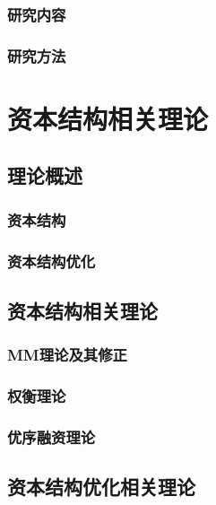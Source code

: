 \subsection{研究内容}
\subsection{研究方法}
\cite{Brusov2023}
\cite{Cao2018}
\cite{Chen2022}
\cite{Dai2022}
\cite{Dong2019}
\cite{Du2016}
\cite{Gu2022}
\cite{Hong2015}
\cite{Li2019}
\cite{Li2019a}
\cite{Li2021}
\cite{Li2023}
\cite{Liaqat2021}
\cite{Liu2017}
\cite{Liu2019}
\cite{Liu2022}
\cite{Liu2023}


\cite{Ma2022}
\cite{Mbulawa2020}
\cite{Meng2020}
\cite{Modigliani1958}
\cite{Shen2022}
\cite{Song2021}
\cite{Spitsin2020}
\cite{Su2022}
\cite{Sun2020}
\cite{Wan2022}
\cite{Wang2008}
\cite{Wang2021}
\cite{Wangchen2022}
\cite{Xiong2022}
\cite{Xu2022}
\cite{Xu2022a}
\cite{Yang2014}
\cite{Yang2020}
\cite{Yao2022}
\cite{Yu2017}
\cite{Zhang2014}
\cite{Zhang2022}
\cite{Zhang2022a}
\cite{Zhu2022}
\cite{Zhu2023}
\cite{Zuo2020}
\chapter{资本结构相关理论}
\section{理论概述}
\subsection{资本结构}
\subsection{资本结构优化}
\section{资本结构相关理论}
\subsection{MM理论及其修正}
\subsection{权衡理论}
\subsection{优序融资理论}
\section{资本结构优化相关理论}

